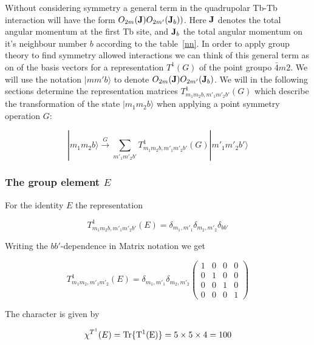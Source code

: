 Without considering symmetry a general term in the quadrupolar Tb-Tb interaction
will have the form $O_{2m}(\mathbf J)O_{2m'}(\mathbf J_b))$. Here $\mathbf J$ denotes the
total angular momentum at the first Tb site, and $\mathbf J_b$ the total angular
momentum on it's neighbour number $b$ according to the table~\ref{nn}. 
In order to apply group theory to find symmetry allowed interactions we
can think of this general term as on of the basis vectors
 for a representation $T^1(G)$ of the point groupo $\bar 4 m 2 $. We will
use the notation $|mm'b\rangle$ to denote $O_{2m}(\mathbf J)O_{2m'}(\mathbf J_b)$.
We will in the following sections determine the representation matrices 
$T^1_{m_1m_2b,m'_1m'_2b'}(G)$ which describe the transformation
of the state $|m_1m_2b\rangle$ when applying a point symmetry 
operation $G$:

\begin{equation}
|m_1m_2b\rangle \stackrel{G}{\rightarrow} \sum_{m'_1m'_2b'} T^1_{m_1m_2b,m'_1m'_2b'}(G)|m'_1m'_2b'\rangle
\end{equation}

\subsubsection{The group element $E$}
 
For the identity $E$ the representation 

\begin{equation}
T^1_{m_1m_2b,m'_1m'_2b'}(E)=\delta_{m_1,m'_1}\delta_{m_2,m'_2}\delta_{bb'}
\end{equation}

Writing the $bb'$-dependence in Matrix notation we get

\begin{equation}\label{E}
T^1_{m_1m_2,m'_1m'_2}(E)=\delta_{m_1,m'_1}\delta_{m_2,m'_2}
\left (
\begin{array}{cccc}
1 & 0 & 0 & 0 \\
0 & 1 & 0 & 0 \\
0 & 0 & 1 & 0 \\
0 & 0 & 0 & 1 
\end{array} \right )
\end{equation}


The character is given by

\begin{equation}
\chi^{T^1}(E)=\rm Tr \{ T^1(E) \}=5\times5\times4=100
\end{equation}

